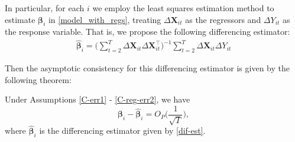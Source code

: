 \documentclass[a4paper,12pt]{article}
\begin{document}
In particular, for each $i$ we employ the least squares estimation method to estimate $\bm{\beta}_i$ in \eqref{model_with_regs}, treating $\Delta \mathbf{X}_{it}$ as the regressors and $\Delta Y_{it}$ as the response variable. That is, we propose the following differencing estimator:
\begin{align}\label{eq:beta_est}
\widehat{\bm{\beta}}_i = \Big( \sum_{t=2}^T \Delta \mathbf{X}_{it} \Delta \mathbf{X}_{it}^\top \Big)^{-1} \sum_{t=2}^T \Delta \mathbf{X}_{it} \Delta Y_{it}
\end{align}

Then the asymptotic consistency for this differencing estimator is given by the following theorem:

\begin{theorem}\label{theo-regs}
Under Assumptions \ref{C-err1} - \ref{C-reg-err2}, we have
\[\bm{\beta}_i - \widehat{\bm{\beta}}_i  = O_P \Big(\frac{1}{\sqrt{T}}\Big),
\]
where $\widehat{\bm{\beta}}_i$ is the differencing estimator given by \eqref{dif-est}.
\end{theorem}


\end{document}
